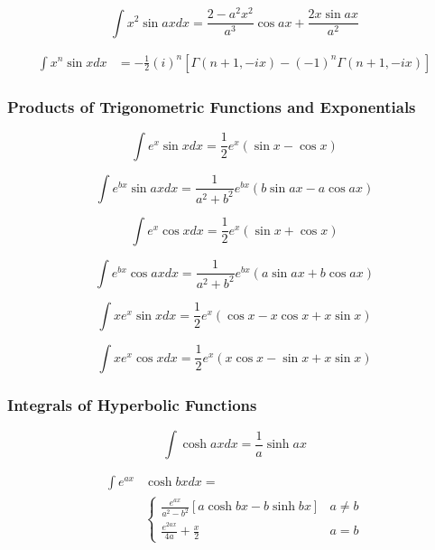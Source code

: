 \documentclass[11pt, letterpaper, notitlepage]{article}
\begin{document}
\begin{multicols}{2}
\begin{footnotesize}
\begin{equation}
\int x^2 \sin ax dx =\frac{2-a^2x^2}{a^3}\cos ax +\frac{ 2 x \sin ax}{a^2} 
\end{equation}

\begin{align}
\int x^n \sin x dx &= -\frac{1}{2}(i)^n\left[ \Gamma(n+1, -ix) 
 - (-1)^n\Gamma(n+1, -ix)\right] 
\end{align}

 
\subsubsection{Products of Trigonometric Functions and Exponentials}

\begin{equation}
\int e^x \sin x dx = \frac{1}{2}e^x (\sin x - \cos x) 
\end{equation}

\begin{equation}
\int e^{bx} \sin ax dx = \frac{1}{a^2+b^2}e^{bx} (b\sin ax - a\cos ax) 
\end{equation}

\begin{equation}
\int e^x \cos x dx = \frac{1}{2}e^x (\sin x + \cos x)  
\end{equation}

\begin{equation}
\int e^{bx} \cos ax dx = \frac{1}{a^2 + b^2} e^{bx} ( a \sin ax + b \cos ax ) 
\end{equation}

\begin{equation}
\int x e^x \sin x dx = \frac{1}{2}e^x (\cos x - x \cos x + x \sin x) 
\end{equation}

\begin{equation}
\int x e^x \cos x dx = \frac{1}{2}e^x (x \cos x 
- \sin x + x \sin x) 
\end{equation}

\subsubsection{Integrals of Hyperbolic Functions}

\begin{equation}
\int \cosh ax dx =\frac{1}{a} \sinh ax 
\end{equation}

\begin{align}
\int e^{ax} & \cosh bx dx = \nonumber \\ &
\begin{cases}
\displaystyle{\frac{e^{ax}}{a^2-b^2} }[ a \cosh bx - b \sinh bx ]  & a\ne b \\
\displaystyle{\frac{e^{2ax}}{4a} + \frac{x}{2}}  & a = b
\end{cases}
\end{align}


\end{footnotesize}
\end{multicols}
\end{document}
